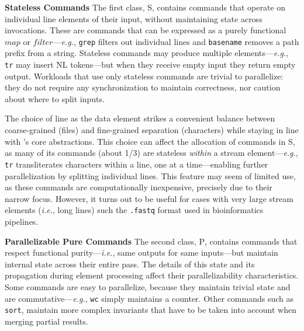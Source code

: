 \documentclass[letterpaper,twocolumn,10pt]{article}
\newcommand{\eg}{{\em e.g.}, }
\newcommand{\ie}{{\em i.e.}, }
\newcommand{\heading}[1]{\vspace{4pt}\noindent\textbf{#1}\enspace}
\newcommand{\ttt}[1]{\texttt{#1}}
\newcommand{\cn}[1]{\mbox{\textcircled{\footnotesize #1}}}
\newcommand{\sta}{\cn{\textsc{S}}\xspace}
\newcommand{\pur}{\cn{\textsc{P}}\xspace}
\newcommand{\nv}[1]{[{\color{cyan}nv: #1}]}
\begin{document}

\heading{Stateless Commands}
The first class, \sta, contains commands that operate on individual line elements of their input, without maintaining state across invocations.
These are commands that can be expressed as a purely functional $map$ or $filter$---\eg \ttt{grep} filters out individual lines and \ttt{basename} removes a path prefix from a string.
Stateless commands may produce multiple elements---\eg \ttt{tr} may insert {\sc NL} tokens---but when they receive empty input they return empty output.
Workloads that use only stateless commands are trivial to parallelize:
  they do not require any synchronization to maintain correctness, nor caution about where to split inputs.

The choice of line as the data element strikes a convenient balance between coarse-grained (files) and fine-grained separation (characters) while staying in line with \unix's core abstractions.
This choice can affect the allocation of commands in \sta, as many of its commands (about 1/3) are stateless \emph{within} a stream element---\eg\ttt{tr} transliterates characters within a line, one at a time---enabling further parallelization by splitting individual lines.
This feature may seem of limited use, as these commands are computationally inexpensive, precisely due to their narrow focus.
However, it turns out to be  useful for cases with very large stream elements (\ie long lines) such the \ttt{.fastq} format used in bioinformatics pipelines.  %


\heading{Parallelizable Pure Commands}
The second class, \pur, contains commands that respect functional purity---\ie same outputs for same inputs---but maintain internal state across their entire pass.
The details of this state and its propagation during element processing affect their parallelizability characteristics.
Some commands are easy to parallelize, because they maintain trivial state and are commutative---\eg \ttt{wc} simply maintains a counter.
Other commands such as \ttt{sort}, maintain more complex invariants that have to be taken into account when merging partial results.
% 
\end{document}
